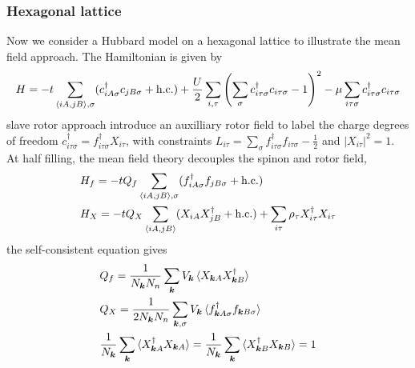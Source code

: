 \documentclass{article}
\begin{document}
\subsubsection{Hexagonal lattice}
Now we consider a Hubbard model on a hexagonal lattice to illustrate the mean field approach. The Hamiltonian is given by
\begin{align*}
    H = -t\sum_{\braket{iA,jB},\sigma}(c_{iA\sigma}^{\dagger}c_{jB\sigma}+\text{h.c.})+\frac{U}{2}\sum_{i,\tau}\left(\sum_{\sigma}c_{i\tau\sigma}^{\dagger}c_{i\tau\sigma}-1\right)^2-\mu\sum_{i\tau\sigma}c_{i\tau\sigma}^{\dagger}c_{i\tau\sigma}
\end{align*}
slave rotor approach introduce an auxilliary rotor field to label the charge degrees of freedom $c_{i\tau\sigma}^{\dagger} = f_{i\tau\sigma}^{\dagger}X_{i\tau}$, with constraints $L_{i\tau} = \sum_{\sigma}f_{i\tau\sigma}^{\dagger}f_{i\tau\sigma} -\frac{1}{2}$ and $|X_{i\tau}|^2 = 1$. At half filling, the mean field theory decouples the spinon and rotor field,
\begin{align*}
    &H_f = -tQ_f\sum_{\braket{iA,jB},\sigma}(f_{iA\sigma}^{\dagger}f_{jB\sigma}+\text{h.c.}) \\
    &H_X = -tQ_X\sum_{\braket{iA,jB}}(X_{iA}X_{jB}^{\dagger}+\text{h.c.})+\sum_{i\tau}\rho_{\tau}X_{i\tau}^{\dagger}X_{i\tau}
\end{align*}
the self-consistent equation gives
\begin{align*}
      &Q_f = \frac{1}{N_{\bm{k}}N_n}\sum_{\bm{k}}V_{\bm{k}}\braket{X_{\bm{k}A}X_{\bm{k}B}^{\dagger}}\\
      &Q_X = \frac{1}{2N_{\bm{k}}N_n}\sum_{\bm{k},\sigma}V_{\bm{k}}\braket{f_{\bm{k}A\sigma}^{\dagger}f_{\bm{k}B\sigma}}\\
      & \frac{1}{N_{\bm{k}}}\sum_{\bm{k}}\braket{X_{\bm{k}A}^{\dagger}X_{\bm{k}A}} = \frac{1}{N_{\bm{k}}}\sum_{\bm{k}}\braket{X_{\bm{k}B}^{\dagger}X_{\bm{k}B}} = 1 
\end{align*}
\appendix
\end{document}
